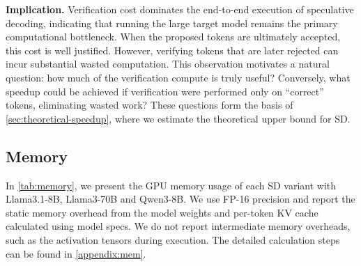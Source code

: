 \documentclass{article}
\begin{document}
\textbf{Implication.} Verification cost dominates the end-to-end execution of speculative decoding, indicating that running the large target model remains the primary computational bottleneck. When the proposed tokens are ultimately accepted, this cost is well justified. However, verifying tokens that are later rejected can incur substantial wasted computation. This observation motivates a natural question: how much of the verification compute is truly useful? Conversely, what speedup could be achieved if verification were performed only on “correct” tokens, eliminating wasted work? These questions form the basis of \autoref{sec:theoretical-speedup}, where we estimate the theoretical upper bound for SD.

\subsection{Memory}
In \autoref{tab:memory}, we present the GPU memory usage of each SD variant with Llama3.1-8B, Llama3-70B and Qwen3-8B.
We use FP-16 precision and report the static memory overhead from the model weights and per-token KV cache calculated using model specs. We do not report intermediate memory overheads, such as the activation tensors during execution. The detailed calculation steps can be found in \autoref{appendix:mem}.
\end{document}
